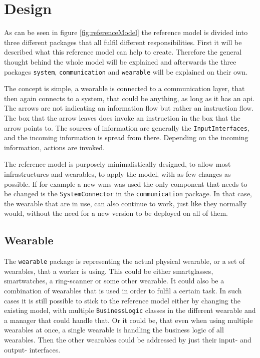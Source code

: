 \section{Design}
As can be seen in figure \ref{fig:referenceModel} the \gls{reference model} is divided into three different packages that all fulfil different responsibilities. First it will be described what this \gls{reference model} can help to create. Therefore the general thought behind the whole model will be explained and afterwards the three packages \texttt{system}, \texttt{communication} and \texttt{wearable} will be explained on their own.

The concept is simple, a wearable is connected to a communication layer, that then again connects to a system, that could be anything, as long as it has an \gls{api}. The arrows are not indicating an information flow but rather an instruction flow. The box that the arrow leaves does invoke an instruction in the box that the arrow points to. The sources of information are generally the \texttt{InputInterfaces}, and the incoming information is spread from there. Depending on the incoming information, actions are invoked. 

The \gls{reference model} is purposely minimalistically designed, to allow most infrastructures and wearables, to apply the model, with as few changes as possible. If for example a new \gls{wms} was used the only component that needs to be changed is the \texttt{SystemConnector} in the \texttt{communication} package. In that case, the wearable that are in use, can also continue to work, just like they normally would, without the need for a new version to be deployed on all of them.

\subsection{Wearable}
The \texttt{\gls{wearable}} package is representing the actual physical wearable, or a set of wearables, that a worker is using. This could be either \gls{smartglasses}, \gls{smartwatch}es, a ring-scanner or some other \gls{wearable}. It could also be a combination of wearables that is used in order to fulfil a certain task. In such cases it is still possible to stick to the \gls{reference model} either by changing the existing model, with multiple \texttt{BusinessLogic} classes in the different wearable and a manager that could handle that. Or it could be, that even when using multiple wearables at once, a single wearable is handling the business logic of all wearables. Then the other wearables could be addressed by just their input- and output- interfaces.

